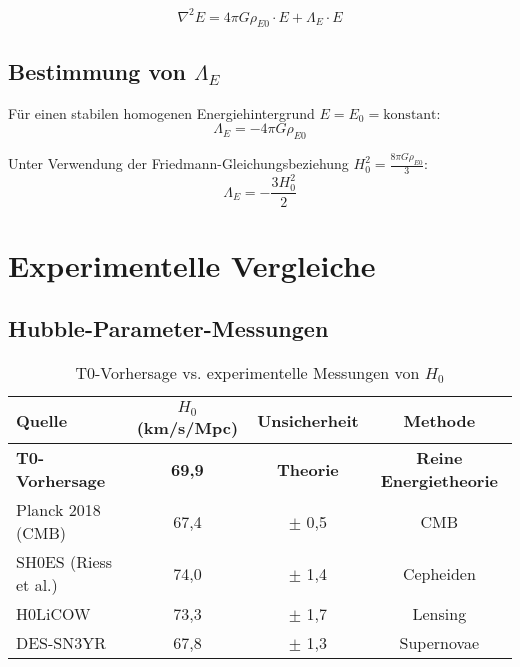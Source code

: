 \documentclass[12pt,a4paper]{article}
\begin{document}
	\begin{equation}
		\nabla^2 E = 4\pi G \rho_{E0} \cdot E + \Lambda_E \cdot E
	\end{equation}
	
	\subsection{Bestimmung von $\Lambda_E$}
	Für einen stabilen homogenen Energiehintergrund $E = E_0 = \text{konstant}$:
	\begin{equation}
		\Lambda_E = -4\pi G \rho_{E0}
	\end{equation}
	
	Unter Verwendung der Friedmann-Gleichungsbeziehung $H_0^2 = \frac{8\pi G \rho_{E0}}{3}$:
	\begin{equation}
		\Lambda_E = -\frac{3H_0^2}{2}
	\end{equation}
	
	\section{Experimentelle Vergleiche}
	
	\subsection{Hubble-Parameter-Messungen}
	
	\begin{table}[htbp]
		\centering
		\begin{tabular}{lccc}
			\toprule
			\textbf{Quelle} & \textbf{$H_0$ (km/s/Mpc)} & \textbf{Unsicherheit} & \textbf{Methode} \\
			\midrule
			\rowcolor{green!20}
			\textbf{T0-Vorhersage} & \textbf{69{,}9} & \textbf{Theorie} & \textbf{Reine Energietheorie} \\
			Planck 2018 (CMB) & 67{,}4 & $\pm$ 0{,}5 & CMB \\
			SH0ES (Riess et al.) & 74{,}0 & $\pm$ 1{,}4 & Cepheiden \\
			H0LiCOW & 73{,}3 & $\pm$ 1{,}7 & Lensing \\
			DES-SN3YR & 67{,}8 & $\pm$ 1{,}3 & Supernovae \\
			\bottomrule
		\end{tabular}
		\caption{T0-Vorhersage vs. experimentelle Messungen von $H_0$}
		\label{tab:h0_comparison}
	\end{table}
	
\end{document}
